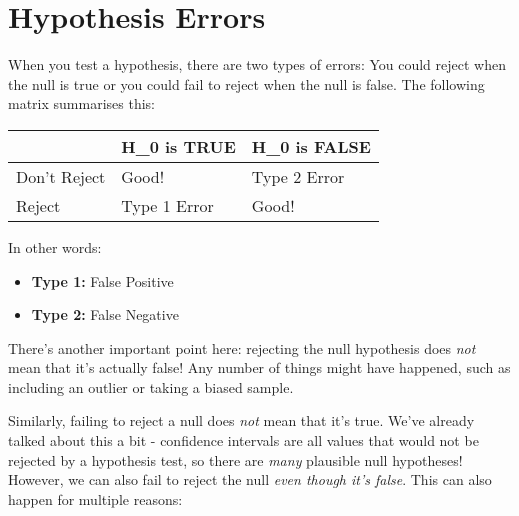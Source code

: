 \documentclass[
  letterpaper,
  DIV=11,
  numbers=noendperiod]{scrreprt}
\providecommand{\tightlist}{%
  \setlength{\itemsep}{0pt}\setlength{\parskip}{0pt}}\usepackage{longtable,booktabs,array}
\begin{document}
\hypertarget{hypothesis-errors}{%
\section{Hypothesis Errors}\label{hypothesis-errors}}

When you test a hypothesis, there are two types of errors: You could
reject when the null is true or you could fail to reject when the null
is false. The following matrix summarises this:

\begin{longtable}[]{@{}lll@{}}
\toprule\noalign{}
& H\_0 is TRUE & H\_0 is FALSE \\
\midrule\noalign{}
\endhead
\bottomrule\noalign{}
\endlastfoot
Don't Reject & Good! & Type 2 Error \\
Reject & Type 1 Error & Good! \\
\end{longtable}

In other words:\vspace{-3mm}

\begin{itemize}
\tightlist
\item
  \textbf{Type 1:} False Positive
\item
  \textbf{Type 2:} False Negative
\end{itemize}

There's another important point here: rejecting the null hypothesis does
\emph{not} mean that it's actually false! Any number of things might
have happened, such as including an outlier or taking a biased sample.

Similarly, failing to reject a null does \emph{not} mean that it's true.
We've already talked about this a bit - confidence intervals are all
values that would not be rejected by a hypothesis test, so there are
\emph{many} plausible null hypotheses! However, we can also fail to
reject the null \emph{even though it's false}. This can also happen for
multiple reasons:
\end{document}
